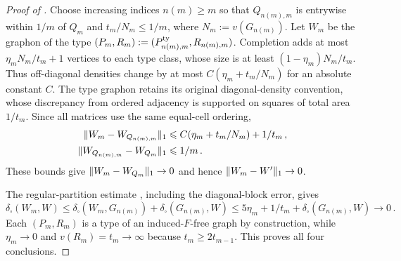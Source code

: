 \begin{proof}[Proof of ]
Choose increasing indices $n(m)\geq m$ so that $Q_{n(m),m}$ is entrywise within $1/m$ of $Q_m$ and $t_m/N_m\leq1/m$, where $N_m:=v(G_{n(m)})$. Let $W_m$ be the graphon of the type $(P_m,R_m):=(P^{\mathrm{ty}}_{n(m),m},R_{n(m),m})$. Completion adds at most $\eta_mN_m/t_m+1$ vertices to each type class, whose size is at least $(1-\eta_m)N_m/t_m$. Thus off-diagonal densities change by at most $C(\eta_m+t_m/N_m)$ for an absolute constant $C$. The type graphon retains its original diagonal-density convention, whose discrepancy from ordered adjacency is supported on squares of total area $1/t_m$. Since all matrices use the same equal-cell ordering,
\begin{align*}
\lVert W_m-W_{Q_{n(m),m}}\rVert_1&\leqslant C(\eta_m+t_m/N_m)+1/t_m\,,\\
\lVert W_{Q_{n(m),m}}-W_{Q_m}\rVert_1&\leqslant1/m\,.
\end{align*}
These bounds give $\lVert W_m-W_{Q_m}\rVert_1\to0$ and hence $\lVert W_m-W'\rVert_1\to0$.

The regular-partition estimate \cite[\S9.1.2]{lovasz2012large}, including the diagonal-block error, gives
$$\delta_\square(W_m,W)\leq\delta_\square(W_m,G_{n(m)})+\delta_\square(G_{n(m)},W)\leq5\eta_m+1/t_m+\delta_\square(G_{n(m)},W)\to0\,.$$
Each $(P_m,R_m)$ is a type of an induced-$F$-free graph by construction, while $\eta_m\to0$ and $v(R_m)=t_m\to\infty$ because $t_m\geq2t_{m-1}$. This proves all four conclusions.
\end{proof}
